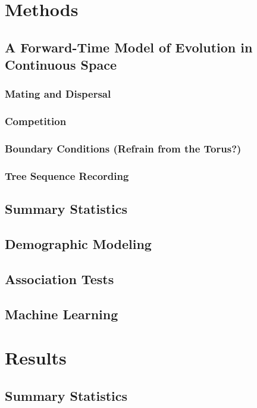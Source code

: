 \documentclass[12pt]{amsart}
\begin{document}
\section{Methods}
\subsection{ A Forward-Time Model of Evolution in Continuous Space }

\subsubsection{ Mating and Dispersal } 

\subsubsection{ Competition } 

\subsubsection{ Boundary Conditions (Refrain from the Torus?) } 

\subsubsection{ Tree Sequence Recording } 

\subsection{ Summary Statistics } 

\subsection{ Demographic Modeling }

\subsection{ Association Tests } 

\subsection{ Machine Learning }


\section{Results}

\subsection{ Summary Statistics }
\end{document}
